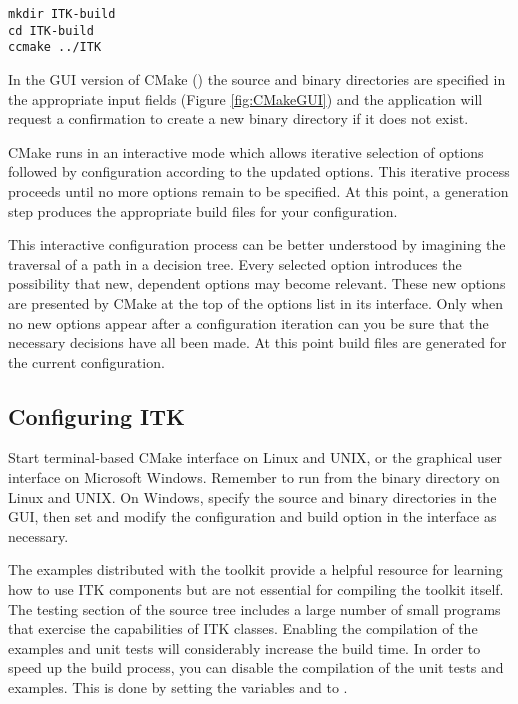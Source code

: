 \small
\begin{verbatim}
mkdir ITK-build
cd ITK-build
ccmake ../ITK
\end{verbatim}
\normalsize

In the GUI version of CMake () the source and binary directories
are specified in the appropriate input fields (Figure \ref{fig:CMakeGUI}) and
the application will request a confirmation to create a new binary directory if
it does not exist.

CMake runs in an interactive mode which allows iterative selection of options
followed by configuration according to the updated options. This iterative
process proceeds until no more options remain to be specified. At this point, a
generation step produces the appropriate build files for your configuration.

This interactive configuration process can be better understood by imagining
the traversal of a path in a decision tree. Every selected option introduces the
possibility that new, dependent options may become relevant. These new options
are presented by CMake at the top of the options list in its interface. Only
when no new options appear after a configuration iteration can you be sure that
the necessary decisions have all been made. At this point build files are
generated for the current configuration.

\subsection{Configuring ITK}
\label{sec:ConfigureITK}


Start terminal-based CMake interface  on Linux and UNIX, or the
graphical user interface  on Microsoft Windows. Remember to run
 from the binary directory on Linux and UNIX. On Windows, specify
the source and binary directories in the GUI, then set and modify the
configuration and build option in the interface as necessary.

The examples distributed with the toolkit provide a helpful resource for
learning how to use ITK components but are not essential for compiling the
toolkit itself. The testing section of the source tree includes a large number
of small programs that exercise the capabilities of ITK classes. Enabling the
compilation of the examples and unit tests will considerably increase the build
time. In order to speed up the build process, you can disable the compilation of
the unit tests and examples. This is done by setting the variables
 and  to .

